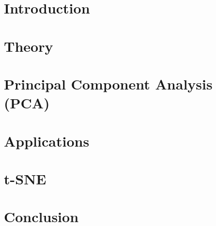 






 

\begin{titlepage}


\end{titlepage}


\setcounter{savepage}{\value{page}}


\section{Introduction}

\clearpage

\section{Theory}

\clearpage

\section{Principal Component Analysis (PCA)}

\clearpage

\section{Applications}

\clearpage

\section{t-SNE}

\clearpage

\section{Conclusion}

\clearpage

\singlespacing
\appendix
{}
\setcounter{page}{\numexpr\value{savepage}}






